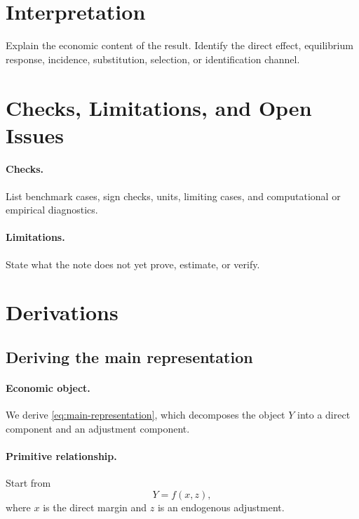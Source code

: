 \documentclass[11pt]{article}
\numberwithin{equation}{section}
\theoremstyle{definition}
\theoremstyle{remark}
\newcommand{\1}{\mathds{1}}
\begin{document}
\section{Interpretation}\label{sec:interpretation}

Explain the economic content of the result. Identify the direct effect, equilibrium response, incidence, substitution, selection, or identification channel.

\section{Checks, Limitations, and Open Issues}\label{sec:checks}

\paragraph{Checks.}
List benchmark cases, sign checks, units, limiting cases, and computational or empirical diagnostics.

\paragraph{Limitations.}
State what the note does not yet prove, estimate, or verify.

\appendix

\section{Derivations}\label{app:derivations}

\subsection{Deriving the main representation}\label{app:derive-main}

\paragraph{Economic object.}
We derive \eqref{eq:main-representation}, which decomposes the object \(Y\) into a direct component and an adjustment component.

\paragraph{Primitive relationship.}
Start from
\begin{equation}\label{eq:primitive}
  Y = f(x,z),
\end{equation}
where \(x\) is the direct margin and \(z\) is an endogenous adjustment.
\end{document}
